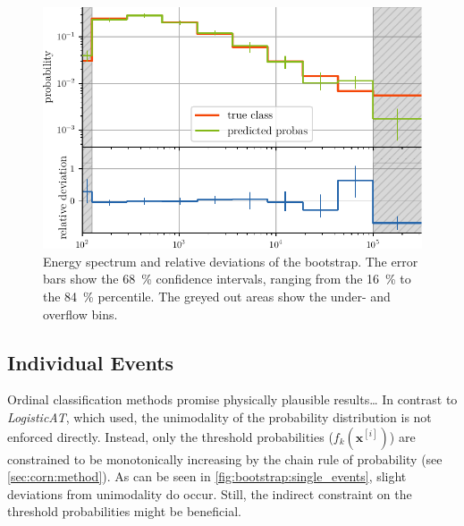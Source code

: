 
\begin{figure}
  \centering
  \includegraphics[scale=1]{content/plots/bootstrap:spectrum_full.pdf}
  \caption{
    Energy spectrum and relative deviations of the bootstrap.
    The error bars show the \SI{68}{\percent} confidence intervals,
    ranging from the \SI{16}{\percent} to the \SI{84}{\percent} percentile.
    The greyed out areas show the under- and overflow bins.
  }
  \label{fig:bootstrap:spectrum}
\end{figure}


\subsection{Individual Events}
Ordinal classification methods promise physically plausible results… %
In contrast to \emph{LogisticAT},
    which \citeauthor{dsea_jan} \cite{dsea_jan} used,
  the unimodality of the probability distribution is not enforced directly.
Instead,
  only the threshold probabilities ($f_k(\mathbf{x}^{[i]})$) are constrained to be monotonically increasing
  by the chain rule of probability
  (see \autoref{sec:corn:method}).
As can be seen in \autoref{fig:bootstrap:single_events},
  slight deviations from unimodality do occur.
Still,
  the indirect constraint on the threshold probabilities
  might be beneficial.

